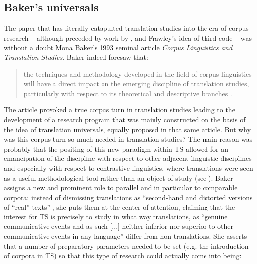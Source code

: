 \subsection{Baker’s universals}
\label{sec:2.2.2}  
\hypertarget{Bakersuniversals}{}
The paper that has literally catapulted translation studies into the era of corpus research – although preceded by work by \citet{toury_search_1980}, \citet{wollin_translationese_1986} and Frawley’s idea of third code \citep{frawley_translation:_1984} – was without a doubt Mona Baker’s 1993 seminal article \textit{Corpus Linguistics and Translation Studies}. Baker indeed foresaw that:

\begin{quote}
the techniques and methodology developed in the field of corpus linguistics will have a direct impact on the emerging discipline of translation studies, particularly with respect to its theoretical and descriptive branches \citep[233]{baker_corpus_1993}.
\end{quote}

The article provoked a true corpus turn in translation studies leading to the development of a research program that was mainly constructed on the basis of the idea of translation universals, equally proposed in that same article. But why was this corpus turn so much needed in translation studies? The main reason was probably that the positing of this new paradigm within TS allowed for an emancipation of the discipline with respect to other adjacent linguistic disciplines and especially with respect to contrastive linguistics, where translations were seen as a useful methodological tool rather than an object of study (see ). Baker assigns a new and prominent role to parallel and in particular to comparable corpora: instead of dismissing translations as “second-hand and distorted versions of ``real'' texts” \citep[233]{baker_corpus_1993}, she puts them at the center of attention, claiming that the interest for TS is precisely to study in what way translations, as “genuine communicative events and as such [...] neither inferior nor superior to other communicative events in any language” \citep[234]{baker_corpus_1993} differ from non-translations. She asserts that a number of preparatory parameters needed to be set (e.g. the introduction of corpora in TS) so that this type of research could actually come into being:

